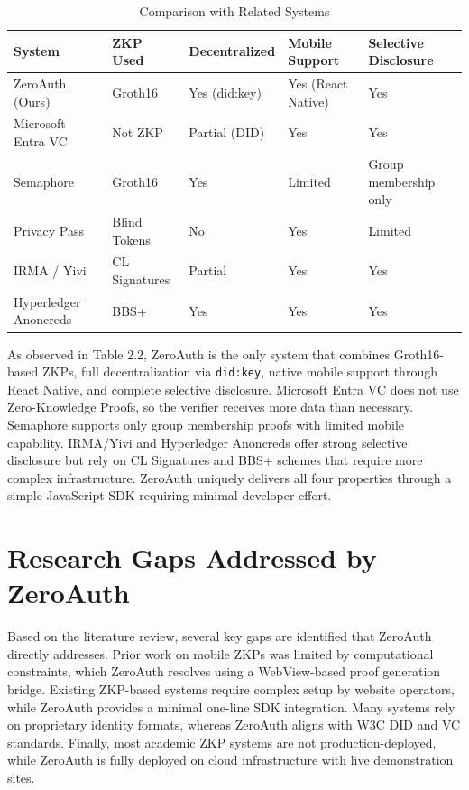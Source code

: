 \begin{table}[H]
\centering
\caption{Comparison with Related Systems}
\begin{tabular}{|p{2.8cm}|p{2.2cm}|p{2.2cm}|p{2.2cm}|p{2.2cm}|}
\hline
\textbf{System} & \textbf{ZKP Used} & \textbf{Decentralized} & \textbf{Mobile Support} & \textbf{Selective Disclosure} \\
\hline
ZeroAuth (Ours) & Groth16 & Yes (did:key) & Yes (React Native) & Yes \\
Microsoft Entra VC & Not ZKP & Partial (DID) & Yes & Yes \\
Semaphore & Groth16 & Yes & Limited & Group membership only \\
Privacy Pass & Blind Tokens & No & Yes & Limited \\
IRMA / Yivi & CL Signatures & Partial & Yes & Yes \\
Hyperledger Anoncreds & BBS+ & Yes & Yes & Yes \\
\hline
\end{tabular}
\end{table}

As observed in Table 2.2, ZeroAuth is the only system that combines Groth16-based ZKPs, full decentralization via \texttt{did:key}, native mobile support through React Native, and complete selective disclosure. Microsoft Entra VC does not use Zero-Knowledge Proofs, so the verifier receives more data than necessary. Semaphore supports only group membership proofs with limited mobile capability. IRMA/Yivi and Hyperledger Anoncreds offer strong selective disclosure but rely on CL Signatures and BBS+ schemes that require more complex infrastructure. ZeroAuth uniquely delivers all four properties through a simple JavaScript SDK requiring minimal developer effort.

\section{Research Gaps Addressed by ZeroAuth}

Based on the literature review, several key gaps are identified that ZeroAuth directly addresses. Prior work on mobile ZKPs was limited by computational constraints, which ZeroAuth resolves using a WebView-based proof generation bridge. Existing ZKP-based systems require complex setup by website operators, while ZeroAuth provides a minimal one-line SDK integration. Many systems rely on proprietary identity formats, whereas ZeroAuth aligns with W3C DID and VC standards. Finally, most academic ZKP systems are not production-deployed, while ZeroAuth is fully deployed on cloud infrastructure with live demonstration sites.
